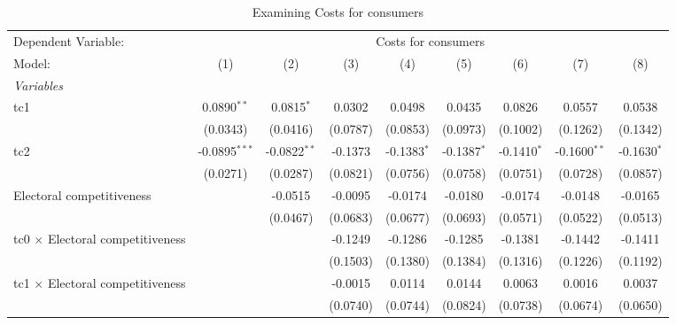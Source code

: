 
\begin{table}[htbp]
   \caption{Examining Costs for consumers}
   \centering
   \begin{tabular}{lcccccccc}
      \tabularnewline \midrule \midrule
      Dependent Variable: & \multicolumn{8}{c}{Costs for consumers}\\
      Model:                                  & (1)             & (2)            & (3)      & (4)           & (5)           & (6)           & (7)            & (8)\\  
      \midrule
      \emph{Variables}\\
      tc1                                     & 0.0890$^{**}$   & 0.0815$^{*}$   & 0.0302   & 0.0498        & 0.0435        & 0.0826        & 0.0557         & 0.0538\\   
                                              & (0.0343)        & (0.0416)       & (0.0787) & (0.0853)      & (0.0973)      & (0.1002)      & (0.1262)       & (0.1342)\\   
      tc2                                     & -0.0895$^{***}$ & -0.0822$^{**}$ & -0.1373  & -0.1383$^{*}$ & -0.1387$^{*}$ & -0.1410$^{*}$ & -0.1600$^{**}$ & -0.1630$^{*}$\\   
                                              & (0.0271)        & (0.0287)       & (0.0821) & (0.0756)      & (0.0758)      & (0.0751)      & (0.0728)       & (0.0857)\\   
      Electoral competitiveness               &                 & -0.0515        & -0.0095  & -0.0174       & -0.0180       & -0.0174       & -0.0148        & -0.0165\\   
                                              &                 & (0.0467)       & (0.0683) & (0.0677)      & (0.0693)      & (0.0571)      & (0.0522)       & (0.0513)\\   
      tc0 $\times$ Electoral competitiveness  &                 &                & -0.1249  & -0.1286       & -0.1285       & -0.1381       & -0.1442        & -0.1411\\   
                                              &                 &                & (0.1503) & (0.1380)      & (0.1384)      & (0.1316)      & (0.1226)       & (0.1192)\\   
      tc1 $\times$ Electoral competitiveness  &                 &                & -0.0015  & 0.0114        & 0.0144        & 0.0063        & 0.0016         & 0.0037\\   
                                              &                 &                & (0.0740) & (0.0744)      & (0.0824)      & (0.0738)      & (0.0674)       & (0.0650)\\   

\end{tabular}
\end{table}
